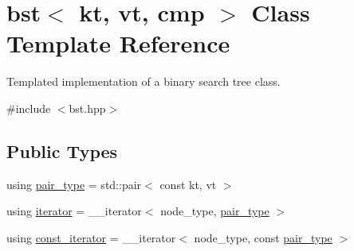 \hypertarget{classbst}{}\section{bst$<$ kt, vt, cmp $>$ Class Template Reference}
\label{classbst}


Templated implementation of a binary search tree class.  




{\ttfamily \#include $<$bst.\+hpp$>$}

\subsection*{Public Types}
\begin{DoxyCompactItemize}
\item 
using \hyperlink{classbst_a7b11cca2a3b4394915600194f741ab16}{pair\+\_\+type} = std\+::pair$<$ const kt, vt $>$
\item 
using \hyperlink{classbst_a429b0445783ff6486882db5dee900ce0}{iterator} = \+\_\+\+\_\+iterator$<$ node\+\_\+type, \hyperlink{classbst_a7b11cca2a3b4394915600194f741ab16}{pair\+\_\+type} $>$
\item 
using \hyperlink{classbst_a72485696d999bf489c6156f6327a2163}{const\+\_\+iterator} = \+\_\+\+\_\+iterator$<$ node\+\_\+type, const \hyperlink{classbst_a7b11cca2a3b4394915600194f741ab16}{pair\+\_\+type} $>$
\end{DoxyCompactItemize}
